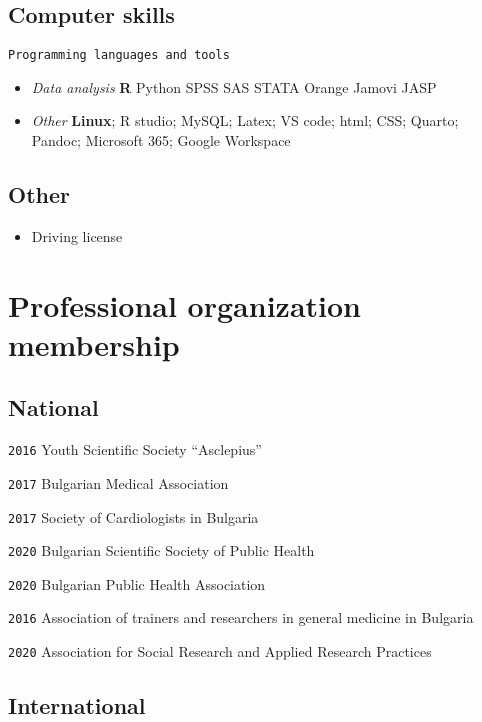 \documentclass[
  12pt,
  letterpaper,
  DIV=11,
  numbers=noendperiod]{scrartcl}
\providecommand{\tightlist}{%
  \setlength{\itemsep}{0pt}\setlength{\parskip}{0pt}}\usepackage{longtable,booktabs,array}
\begin{document}
\subsection{Computer skills}\label{computer-skills}

\texttt{Programming\ languages\ and\ tools}

\begin{itemize}
\item
  \emph{Data analysis} \textbf{R} \textbar{} Python \textbar{} SPSS
  \textbar{} SAS \textbar{} STATA \textbar{} Orange \textbar{} Jamovi
  \textbar{} JASP
\item
  \emph{Other} \textbf{Linux}; R studio; MySQL; Latex; VS code; html;
  CSS; Quarto; Pandoc; Microsoft 365; Google Workspace
\end{itemize}

\subsection{Other}\label{other}

\begin{itemize}
\tightlist
\item
  Driving license
\end{itemize}

\section{Professional organization
membership}\label{professional-organization-membership}

\subsection{National}\label{national}

\texttt{2016} Youth Scientific Society ``Asclepius''

\texttt{2017} Bulgarian Medical Association

\texttt{2017} Society of Cardiologists in Bulgaria

\texttt{2020} Bulgarian Scientific Society of Public Health

\texttt{2020} Bulgarian Public Health Association

\texttt{2016} Association of trainers and researchers in general
medicine in Bulgaria

\texttt{2020} Association for Social Research and Applied Research
Practices

\subsection{International}\label{international}
\end{document}
